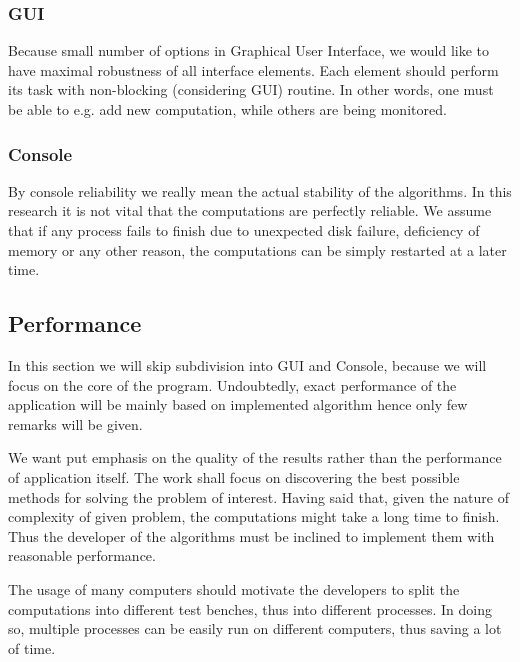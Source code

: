 \documentclass{article}
\begin{document}
\subsubsection{GUI}
Because small number of options in Graphical User Interface, we would like to have maximal robustness of all interface elements. Each element should perform its task with non-blocking (considering GUI) routine. In other words, one must be able to e.g. add new computation, while others are being monitored.


\subsubsection{Console}
By console reliability we really mean the actual stability of the algorithms. In this research it is not vital that the computations are perfectly reliable. We assume that if any process fails to finish due to unexpected disk failure, deficiency of memory or any other reason, the computations can be simply restarted at a later time.


%
%
\subsection{Performance}
In this section we will skip subdivision into GUI and Console, because we will focus on the core of the program. Undoubtedly, exact performance of the application will be mainly based on implemented algorithm hence only few remarks will be given.

We want put emphasis on the quality of the results rather than the performance of application itself. The work shall focus on discovering the best possible methods for solving the problem of interest. Having said that, given the nature of complexity of given problem, the computations might take a long time to finish. Thus the developer of the algorithms must be inclined to implement them with reasonable performance.

The usage of many computers should motivate the developers to split the computations into different test benches, thus into different processes. In doing so, multiple processes can be easily run on different computers, thus saving a lot of time. 
\end{document}

